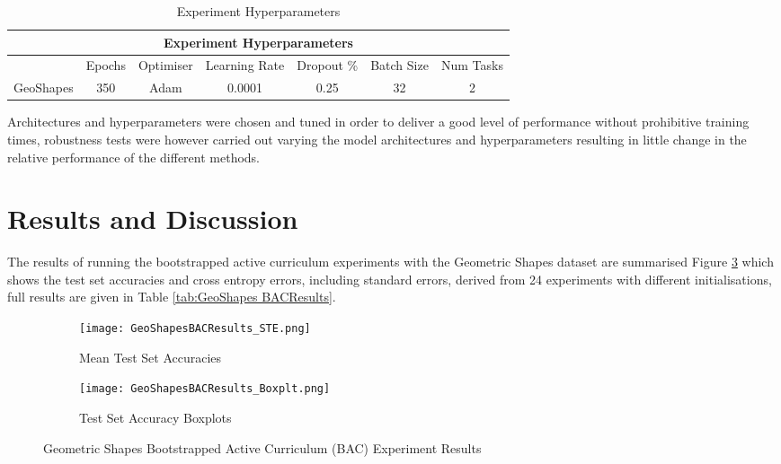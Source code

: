 \begin{table}[h]
\caption{Experiment Hyperparameters} \label{tab:HyperParams}
\begin{tabular}{|c||c|c|c|c|c|c|}
\hline
\multicolumn{7}{|c|}{Experiment Hyperparameters} \\
\hline
 &Epochs & Optimiser &Learning Rate & Dropout \% & Batch Size & Num Tasks \\
\hline
GeoShapes & 350 & Adam & 0.0001 & 0.25 & 32 & 2  \\
\hline
\end{tabular}
\end{table}


Architectures and hyperparameters were chosen and tuned in order to deliver a good level of performance without prohibitive training times, robustness tests were however carried out varying the model architectures and hyperparameters resulting in little change in the relative performance of the different methods. 
\section{Results and Discussion}\label{sec:BAC_Results}
The results of running the bootstrapped active curriculum experiments with the Geometric Shapes dataset are summarised Figure \ref{fig:GeoShapesBACResults} which shows the test set accuracies and cross entropy errors, including standard errors, derived from 24 experiments with different initialisations, full results are given in Table \ref{tab:GeoShapes BACResults}.

\begin{figure}[h]
\hspace*{-3cm}    
\centering
\begin{subfigure}{0.7\textwidth}
  \centering
  \texttt{[image: GeoShapesBACResults\_STE.png]}
  \caption{ Mean Test Set Accuracies}
  \label{fig:BAC_StE}
\end{subfigure}%
\begin{subfigure}{0.7\textwidth}
\hspace*{-1cm}   
  \centering
  \texttt{[image: GeoShapesBACResults\_Boxplt.png]}
  \caption{Test Set Accuracy Boxplots}
  \label{fig:BAC_Boxplt}
\end{subfigure}
\caption{Geometric Shapes Bootstrapped Active Curriculum (BAC) Experiment Results}
\label{fig:GeoShapesBACResults}
\end{figure}

